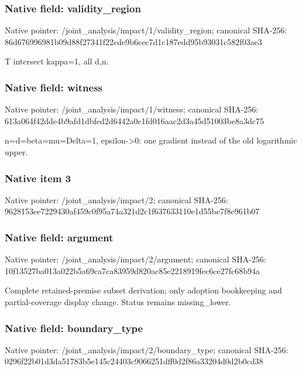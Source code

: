 \documentclass[10pt,a4paper]{article}
\begin{document}
\subsubsection{Native field: validity\_\allowbreak{}region}
Native pointer: /joint\_\allowbreak{}analysis/impact/1/validity\_\allowbreak{}region; canonical SHA-256: 86d676996981b09d88f27341f22cde9b6cec7d1c187edd95b93031c582f03ae3

\begingroup\raggedright\sloppy T intersect kappa=\allowbreak{}1,\allowbreak{} all d,\allowbreak{}n.\par\endgroup

\subsubsection{Native field: witness}
Native pointer: /joint\_\allowbreak{}analysis/impact/1/witness; canonical SHA-256: 613a064f42dde4b9afd1dbfed2d6442a0c1fd016aac2d3a45d51003be8a3dc75

\begingroup\raggedright\sloppy n=\allowbreak{}d=\allowbreak{}beta=\allowbreak{}mu=\allowbreak{}Delta=\allowbreak{}1,\allowbreak{} epsilon->0:\allowbreak{} one gradient instead of the old logarithmic upper.\par\endgroup

\subsubsection{Native item 3}
Native pointer: /joint\_\allowbreak{}analysis/impact/2; canonical SHA-256: 9628153ee7229430af459c0f95a74a321d2c1f637633110e1d55be7f8e961b07

\subsubsection{Native field: argument}
Native pointer: /joint\_\allowbreak{}analysis/impact/2/argument; canonical SHA-256: 10f13527ba013a022b5a69ca7ca83959d820ac85e2218919fec6ce27fc68b94a

\begingroup\raggedright\sloppy Complete retained-premise subset derivation;\allowbreak{} only adoption bookkeeping and partial-coverage display change. Status remains missing\_\allowbreak{}lower.\par\endgroup

\subsubsection{Native field: boundary\_\allowbreak{}type}
Native pointer: /joint\_\allowbreak{}analysis/impact/2/boundary\_\allowbreak{}type; canonical SHA-256: 0296f22b01d3da51783b5e145c24403c9066251dff0d2f86a33204d0d2b0cd38
\end{document}
